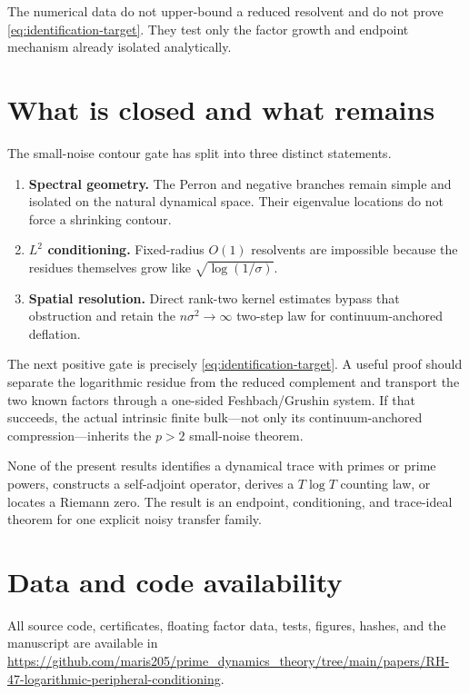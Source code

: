 \documentclass[11pt]{article}
\theoremstyle{remark}
\begin{document}
The numerical data do not upper-bound a reduced resolvent and do not prove
\eqref{eq:identification-target}.  They test only the factor growth and
endpoint mechanism already isolated analytically.

\section{What is closed and what remains}
\label{sec:conclusion}

The small-noise contour gate has split into three distinct statements.
\begin{enumerate}[leftmargin=2.2em]
 \item \textbf{Spectral geometry.}  The Perron and negative branches remain
       simple and isolated on the natural dynamical space.  Their eigenvalue
       locations do not force a shrinking contour.
 \item \textbf{$L^2$ conditioning.}  Fixed-radius $O(1)$ resolvents are
       impossible because the residues themselves grow like
       $\sqrt{\log(1/\sigma)}$.
 \item \textbf{Spatial resolution.}  Direct rank-two kernel estimates bypass
       that obstruction and retain the $n\sigma^2\to\infty$ two-step law for
       continuum-anchored deflation.
\end{enumerate}

The next positive gate is precisely \eqref{eq:identification-target}.  A
useful proof should separate the logarithmic residue from the reduced
complement and transport the two known factors through a one-sided
Feshbach/Grushin system.  If that succeeds, the actual intrinsic finite
bulk---not only its continuum-anchored compression---inherits the $p>2$
small-noise theorem.

None of the present results identifies a dynamical trace with primes or
prime powers, constructs a self-adjoint operator, derives a $T\log T$
counting law, or locates a Riemann zero.  The result is an endpoint,
conditioning, and trace-ideal theorem for one explicit noisy transfer
family.

\section*{Data and code availability}

All source code, certificates, floating factor data, tests, figures, hashes,
and the manuscript are available in
\url{https://github.com/maris205/prime_dynamics_theory/tree/main/papers/RH-47-logarithmic-peripheral-conditioning}.



\end{document}

